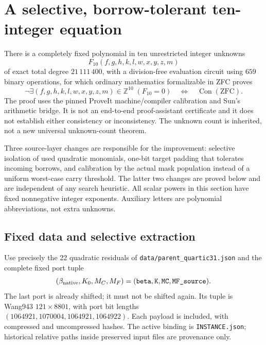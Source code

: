 \section{A selective, borrow-tolerant ten-integer equation}
\label{sec:selective-sun}

There is a completely fixed polynomial in ten unrestricted integer unknowns
\[
 F_{10}(f,g,h,k,l,w,x,y,z,m)
\]
of exact total degree $21\,111\,400$, with a division-free evaluation circuit
using $659$ binary operations, for which ordinary mathematics formalizable
in ZFC proves
\[
 \neg\exists(f,g,h,k,l,w,x,y,z,m)\in\mathbb Z^{10}\;(F_{10}=0)
 \quad\Longleftrightarrow\quad\operatorname{Con}(\mathrm{ZFC}).
\]
The proof uses the pinned ProveIt machine/compiler calibration and Sun's
arithmetic bridge. It is not an end-to-end proof-assistant certificate and
it does not establish either consistency or inconsistency. The unknown
count is inherited, not a new universal unknown-count theorem.

Three source-layer changes are responsible for the improvement:
selective isolation of used quadratic monomials, one-bit target padding
that tolerates incoming borrows, and calibration by the actual mask
population instead of a uniform worst-case carry threshold. The latter
two changes are proved below and are independent of any search heuristic.
All scalar powers in this section have fixed nonnegative integer exponents.
Auxiliary letters are polynomial abbreviations, not extra unknowns.

\subsection{Fixed data and selective extraction}

Use precisely the 22 quadratic residuals of
\texttt{data/parent\_quartic31.json} and the complete fixed port tuple
\[
 (\beta_{\rm native},K_0,M_C,M_F)
 = (\texttt{beta},\texttt{K},\texttt{MC},\texttt{MF\_source}).
\]
The last port is already shifted; it must not be shifted again. Its tuple
is Wang943 $121\times8801$, with port bit lengths
$(1064921,1070004,1064921,1064922)$. Each payload is included, with compressed
and uncompressed hashes. The active binding is \texttt{INSTANCE.json};
historical relative paths inside preserved input files are provenance only.

